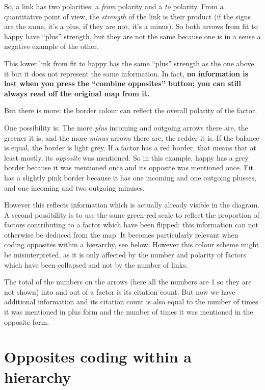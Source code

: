 \documentclass[
]{book}
\begin{document}
So, a link has two polarities: a \emph{from} polarity and a \emph{to} polarity. From a quantitative point of view, the \emph{strength} of the link is their product (if the signs are the same, it's a plus, if they are not, it's a minus). So both arrows from fit to happy have ``plus'' strength, but they are not the same because one is in a sense a negative example of the other.

This lower link from fit to happy has the same ``plus'' strength as the one above it but it does not represent the same information. In fact, \textbf{no information is lost when you press the ``combine opposites'' button; you can still always read off the original map from it.}

But there is more: the border colour can reflect the overall polarity of the factor.

One possibility is: The more \emph{plus} incoming and outgoing arrows there are, the greener it is, and the more \emph{minus} arrows there are, the redder it is. If the balance is equal, the border is light grey. If a factor has a red border, that means that at least mostly, its \emph{opposite} was mentioned. So in this example, happy has a grey border because it was mentioned once and its opposite was mentioned once. Fit has a slightly pink border because it has one incoming and one outgoing plusses, and one incoming and two outgoing minuses.

However this reflects information which is actually already visible in the diagram. A second possibility is to use the same green-red scale to reflect the proportion of factors contributing to a factor which have been flipped: this information can not otherwise be deduced from the map. It becomes particularly relevant when coding opposites within a hierarchy, see below. However this colour scheme might be misinterpreted, as it is only affected by the number and polarity of factors which have been collapsed and not by the number of links.

The total of the numbers on the arrows (here all the numbers are 1 so they are not shown) into and out of a factor is its citation count. But now we have additional information and its citation count is also equal to the number of times it was mentioned in plus form and the number of times it was mentioned in the opposite form.

\hypertarget{opposites-coding-within-a-hierarchy}{%
\section{Opposites coding within a hierarchy}\label{opposites-coding-within-a-hierarchy}}
\end{document}
